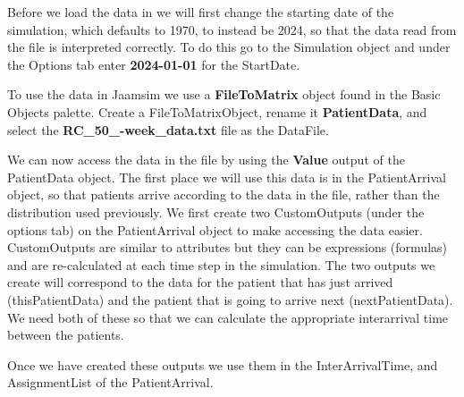 \documentclass[
  10pt,
  a4paperpaper,
  DIV=11,
  numbers=noendperiod,
  oneside]{scrreprt}
\begin{document}
Before we load the data in we will first change the starting date of the
simulation, which defaults to 1970, to instead be 2024, so that the data
read from the file is interpreted correctly. To do this go to the
Simulation object and under the Options tab enter \textbf{2024-01-01}
for the StartDate.

To use the data in Jaamsim we use a \textbf{FileToMatrix} object found
in the Basic Objects palette. Create a FileToMatrixObject, rename it
\textbf{PatientData}, and select the \textbf{RC\_50\_-week\_data.txt}
file as the DataFile.

We can now access the data in the file by using the \textbf{Value}
output of the PatientData object. The first place we will use this data
is in the PatientArrival object, so that patients arrive according to
the data in the file, rather than the distribution used previously. We
first create two CustomOutputs (under the options tab) on the
PatientArrival object to make accessing the data easier. CustomOutputs
are similar to attributes but they can be expressions (formulas) and are
re-calculated at each time step in the simulation. The two outputs we
create will correspond to the data for the patient that has just arrived
(thisPatientData) and the patient that is going to arrive next
(nextPatientData). We need both of these so that we can calculate the
appropriate interarrival time between the patients.

Once we have created these outputs we use them in the InterArrivalTime,
and AssignmentList of the PatientArrival.

\begin{table}[H]

\caption{\label{tbl-pat_arr}Update PatientArrival}


\end{table}%
\end{document}
